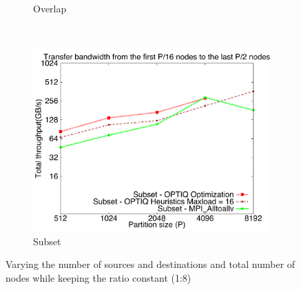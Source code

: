 \begin{figure}[!htbp]
\begin{subfigure}[b]{0.32\textwidth}
                \caption{Overlap}
                \label{fig:3_1024_hopbyte}
        \end{subfigure}
        ~ %
        \begin{subfigure}[b]{0.32\textwidth}
                \includegraphics[width=\textwidth]{figures/constantr_87}
                \caption{Subset}
                \label{fig:3_1024_hopcopy}
        \end{subfigure}
        \caption{Varying the number of sources and destinations and total number of nodes while keeping the ratio constant (1:8) }
        \label{fig:3_1024_histo}
\end{figure}

